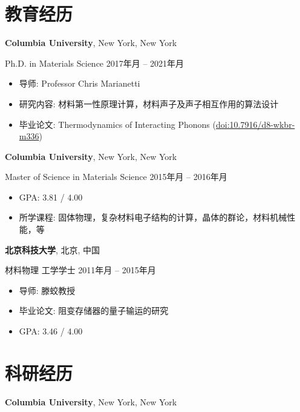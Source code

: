 \documentclass[
  a4paper,
  12pt
]{cv}
\author{富律文}
\renewcommand{\DatestampYMD}[3]{\mbox{#1年\number#2月}}
\begin{document}
\maketitle

\section{教育经历}

{\textbf{Columbia University}},
New York, New York

Ph.D. in
{Materials Science}
\hfill
\DatestampYMD{2017}{01}{10} --
\DatestampYMD{2021}{10}{20}
\begin{itemize}
\item 导师: Professor Chris Marianetti
\item 研究内容: 材料第一性原理计算，材料声子及声子相互作用的算法设计
\item 毕业论文: Thermodynamics of Interacting Phonons (\href{https://doi.org/10.7916/d8-wkbr-m336}{doi:10.7916/d8-wkbr-m336})
\end{itemize}


{\textbf{Columbia University}},
New York, New York

Master of Science in
{Materials Science}
\hfill
\DatestampYMD{2015}{09}{01} --
\DatestampYMD{2016}{12}{23}
\begin{itemize}
\item GPA: 3.81 / 4.00
\item 所学课程: 固体物理，复杂材料电子结构的计算，晶体的群论，材料机械性能，等
\end{itemize}


{\textbf{北京科技大学}},
北京, 中国

{材料物理} 工学学士
\hfill
\DatestampYMD{2011}{09}{01} --
\DatestampYMD{2015}{06}{26}
\begin{itemize}
\item 导师: 滕蛟教授
\item 毕业论文: 阻变存储器的量子输运的研究
\item GPA: 3.46 / 4.00
\end{itemize}


\section{科研经历}

{\textbf{Columbia University}},
New York, New York
\end{document}

